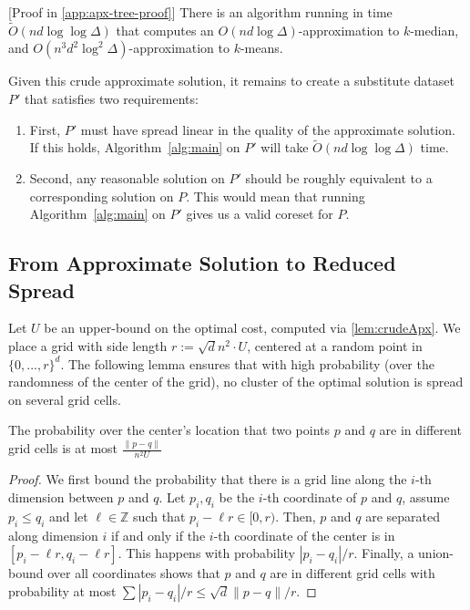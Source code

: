 \begin{lemma}\label{lem:crudeApx}[Proof in \cref{app:apx-tree-proof}]
There is an algorithm running in time $\tilde O(nd \log \log \Delta)$ that computes an $O(n d \log \Delta)$-approximation to $k$-median, and $O(n^3 d^2 \log^2
\Delta)$-approximation to $k$-means.
\end{lemma}

Given this crude approximate solution, it remains to create a substitute dataset $P'$ that
satisfies two requirements:
\begin{enumerate}
    \item First, $P'$ must have spread linear in the quality of the approximate solution. If this holds, Algorithm~\ref{alg:main} on $P'$ will take
        $\tilde{O}(nd \log \log \Delta)$ time.
    \item Second, any reasonable solution on $P'$ should be roughly equivalent to a corresponding solution on $P$. This would mean that running
        Algorithm~\ref{alg:main} on $P'$ gives us a valid coreset for $P$.
\end{enumerate}

\subsection{From Approximate Solution to Reduced Spread}
\label{ssec:reduce_spread}

Let $U$ be an upper-bound on the optimal cost, computed via \cref{lem:crudeApx}. We place a grid with side length $r:= \sqrt{d} n^2\cdot U$, centered at
a random point in $\{0, ..., r\}^d$.  The following lemma ensures that with high probability (over the randomness of the center of the grid), no cluster of the
optimal solution is spread on several grid cells.

\begin{lemma}\label{lem:quadtreeSep}

The probability over the center's location that two points $p$ and $q$ are in different grid cells is at most $\frac{\|p-q\|}{n^2 U}$

\end{lemma}
\begin{proof}
We first bound the probability that there is a grid line along the $i$-th dimension between $p$ and $q$. Let $p_i, q_i$ be the $i$-th coordinate of $p$ and $q$,
assume $p_i \leq q_i$ and let $\ell \in \mathbb{Z}$ such that $p_i - \ell r \in [0, r)$.  Then, $p$ and $q$ are separated along dimension $i$ if and only if the
$i$-th coordinate of the center is in $[p_i - \ell r, q_i - \ell r]$. This happens with probability $|p_i - q_i|/r$.  Finally, a union-bound over all
coordinates shows that $p$ and $q$ are in different grid cells with probability at most $\sum |p_i-q_i| / r \leq \sqrt{d} \|p-q\|/r$.
\end{proof}

